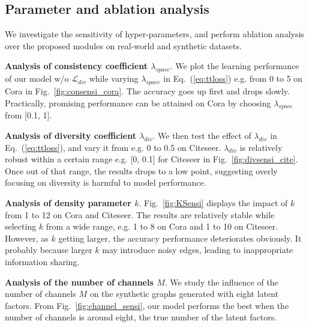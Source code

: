 \documentclass[accepted]{uai2021} %
\begin{document}
\subsection{Parameter and ablation analysis}
We investigate the sensitivity of hyper-parameters, and perform ablation analysis over the proposed modules on real-world and synthetic datasets.

\textbf{Analysis of consistency coefficient $\lambda_{space}$}. We plot the learning performance of our model w/o $\mathcal{L}_{div}$  while varying $\lambda_{space}$ in Eq.~(\ref{eq:ttloss}) e.g. from 0 to 5 on Cora in Fig.~\ref{fig:consensi_cora}. The accuracy goes up first and drops slowly. Practically, promising performance can be attained on Cora by choosing $\lambda_{space}$ from [0.1, 1].

\textbf{Analysis of diversity coefficient $\lambda_{div}$}. We then test the effect of $\lambda_{div}$ in Eq.~(\ref{eq:ttloss}), and vary it from e.g. 0 to 0.5 on Citeseer. $\lambda_{div}$ is relatively robust within a certain range e.g. [0, 0.1] for Citeseer in Fig.~\ref{fig:divsensi_cite}. Once out of that range, the results drops to a low point, suggesting overly focusing on diversity is harmful to model performance.

\textbf{Analysis of density parameter $k$}. Fig.~\ref{fig:KSensi} displays the impact of $k$ from 1 to 12 on Cora and Citeseer. The results are relatively stable while selecting $k$ from a wide range, e.g. 1 to 8 on Cora and 1 to 10 on Citeseer. However, as $k$ getting larger, the accuracy performance deteriorates obviously. It probably because larger $k$ may introduce noisy edges, leading to inappropriate information sharing.

\textbf{Analysis of the number of channels $M$}. We study the influence of the number of channels $M$ on the synthetic graphs generated with eight latent factors. From Fig.~\ref{fig:channel_sensi}, our model performs the best when the number of channels is around eight, the true number of the latent factors.
\end{document}
